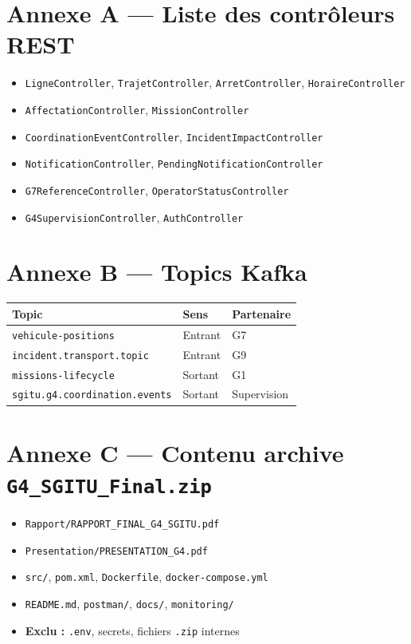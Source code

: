 \documentclass[12pt,a4paper]{report}
\begin{document}
\chapter{Annexe A — Liste des contrôleurs REST}
\begin{itemize}[leftmargin=*]
    \item \texttt{LigneController}, \texttt{TrajetController}, \texttt{ArretController}, \texttt{HoraireController}
    \item \texttt{AffectationController}, \texttt{MissionController}
    \item \texttt{CoordinationEventController}, \texttt{IncidentImpactController}
    \item \texttt{NotificationController}, \texttt{PendingNotificationController}
    \item \texttt{G7ReferenceController}, \texttt{OperatorStatusController}
    \item \texttt{G4SupervisionController}, \texttt{AuthController}
\end{itemize}

\chapter{Annexe B — Topics Kafka}
\begin{center}
\small
\begin{tabular}{@{}lll@{}}
\toprule
\textbf{Topic} & \textbf{Sens} & \textbf{Partenaire} \\
\midrule
\texttt{vehicule-positions} & Entrant & G7 \\
\texttt{incident.transport.topic} & Entrant & G9 \\
\texttt{missions-lifecycle} & Sortant & G1 \\
\texttt{sgitu.g4.coordination.events} & Sortant & Supervision \\
\bottomrule
\end{tabular}
\end{center}

\chapter{Annexe C — Contenu archive \texttt{G4\_SGITU\_Final.zip}}
\begin{itemize}[leftmargin=*]
    \item \texttt{Rapport/RAPPORT\_FINAL\_G4\_SGITU.pdf}
    \item \texttt{Presentation/PRESENTATION\_G4.pdf}
    \item \texttt{src/}, \texttt{pom.xml}, \texttt{Dockerfile}, \texttt{docker-compose.yml}
    \item \texttt{README.md}, \texttt{postman/}, \texttt{docs/}, \texttt{monitoring/}
    \item \textbf{Exclu :} \texttt{.env}, secrets, fichiers \texttt{.zip} internes
\end{itemize}
\end{document}
